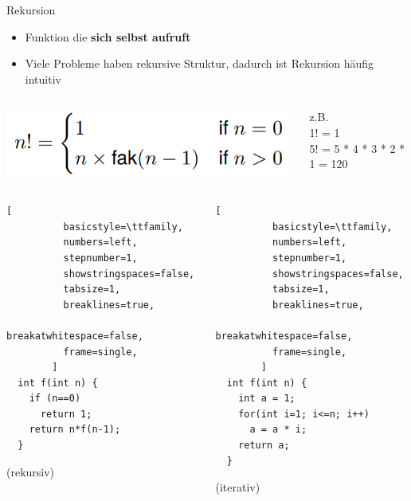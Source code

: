 \documentclass[
  german,            %
  aspectratio=169,    %
]{tumbeamer}
\begin{document}
  \begin{frame}[c, fragile]{Rekursion}{}
	\begin{itemize}
	  \item Funktion die \textbf{sich selbst aufruft}
	  \item Viele Probleme haben rekursive Struktur, dadurch ist Rekursion häufig intuitiv
	\end{itemize}
	\begin{columns}[c]
	  \begin{column}{0.48\textwidth}
		\includegraphics[width=0.9\linewidth]{w04_fak_rec_zue.png}
	  \end{column}
	  \begin{column}{0.48\textwidth}
		z.B. \\
		1! = 1 \\
		5! = 5 * 4 * 3 * 2 * 1 = 120
	  \end{column}
	\end{columns}
	\begin{columns}[c]
	  \begin{column}{0.48\textwidth}
		\begin{lstlisting}[
		  basicstyle=\ttfamily,
		  numbers=left,
		  stepnumber=1,
		  showstringspaces=false,
		  tabsize=1,
		  breaklines=true,
		  breakatwhitespace=false,
		  frame=single,
		]
  int f(int n) {
	if (n==0)
	  return 1;
	return n*f(n-1);
  }
		\end{lstlisting}
		\centering
		(rekursiv)
	  \end{column}
	  \begin{column}{0.48\textwidth}
		\begin{lstlisting}[
		  basicstyle=\ttfamily,
		  numbers=left,
		  stepnumber=1,
		  showstringspaces=false,
		  tabsize=1,
		  breaklines=true,
		  breakatwhitespace=false,
		  frame=single,
		]
  int f(int n) {
	int a = 1;
	for(int i=1; i<=n; i++)
	  a = a * i;
	return a;
  }
		\end{lstlisting}
		\centering
		(iterativ)
	  \end{column}
	\end{columns}
  \end{frame}
  
\end{document}
